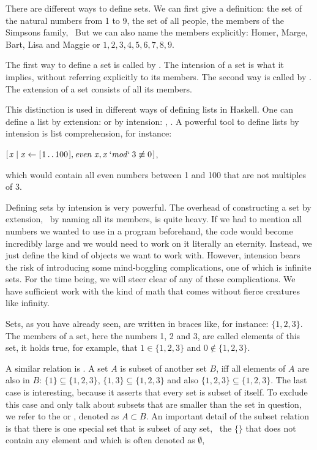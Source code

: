 \documentclass{scrreprt}
\newcommand{\Varid}[1]{\mathit{#1}}
\begin{document}
There are different ways to define sets.
We can first give a definition:
the set of the natural numbers from 1 to 9,
the set of all people, 
the members of the Simpsons family, \etc\
But we can also name the members explicitly:
Homer, Marge, Bart, Lisa and Maggie or
$1,2,3,4,5,6,7,8,9$.

The first way to define a set is called 
by . The intension of a set is
what it implies, without referring explicitly
to its members.
The second way is called by .
The extension of a set consists of all its members.

This distinction is used in different ways of
defining lists in Haskell.
One can define a list by extension:
\haskell{[1,2,3,4,5]}
or by intension:
\haskell{[1..5]}, \haskell{[1..]}.
A powerful tool to define lists by intension 
is list comprehension, for instance:

\ensuremath{[\mskip1.5mu \Varid{x}\mid \Varid{x}\leftarrow [\mskip1.5mu \mathrm{1}\mathinner{\ldotp\ldotp}\mathrm{100}\mskip1.5mu],\Varid{even}\;\Varid{x},\Varid{x}\mathbin{\Varid{`mod`}}\mathrm{3}\not\equiv \mathrm{0}\mskip1.5mu]},

which would contain all even numbers
between 1 and 100 that are not multiples of 3.

Defining sets by intension is 
very powerful. 
The overhead of constructing a set by extension,
\ie\ by naming all its members,
is quite heavy.
If we had to mention all numbers we wanted to use
in a program beforehand, the code would become incredibly large
and we would need to work on it literally an eternity.
Instead, we just define the kind of objects we want to work with.
However, intension bears the risk
of introducing some mind-boggling complications,
one of which is infinite sets.
For the time being, 
we will steer clear of any of these complications.
We have sufficient work with the kind of math
that comes without fierce creatures like infinity.

Sets, as you have already seen, are written in braces
like, for instance:
$\lbrace 1,2,3\rbrace$.
The members of a set, here the numbers 1, 2 and 3,
are called elements of this set,
it holds true, for example, that
$1 \in \lbrace 1,2,3\rbrace$ and 
$0 \not\in \lbrace 1,2,3\rbrace$.

A similar relation is .
A set $A$ is subset of another set $B$, iff
all elements of $A$ are also in $B$:
$\lbrace 1\rbrace \subseteq \lbrace 1,2,3\rbrace$,
$\lbrace 1,3\rbrace \subseteq \lbrace 1,2,3\rbrace$
and also
$\lbrace 1,2,3\rbrace \subseteq \lbrace 1,2,3\rbrace$.
The last case is interesting,
because it asserts that every set is subset of itself.
To exclude this case and only talk about subsets
that are smaller than the set in question,
we refer to the  or ,
denoted as $A \subset B$.
An important detail of the subset relation is
that there is one special set that is subset of any set,
\viz\ the  $\lbrace\rbrace$
that does not contain any element and which is 
often denoted as $\emptyset$,
\end{document}
